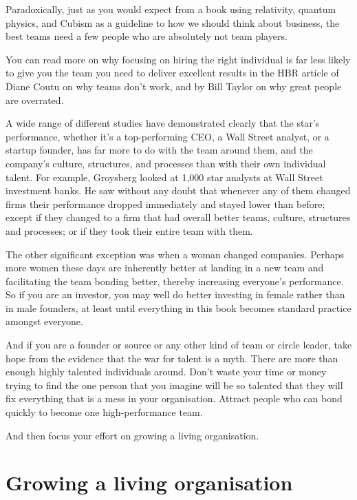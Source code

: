 Paradoxically, just as you would expect from a book using relativity,  quantum physics,  and Cubism  as a guideline to how we should think about business, the best teams need a few people who are absolutely not team players.


You can read more on why focusing on hiring the right individual is far less likely to give you the team you need to deliver excellent results in the HBR article of Diane Coutu\cite{coutu-why-teams-dont-work}  on why teams don't work, and by Bill Taylor  on why great people are overrated\cite{taylor-great-people-overrated-1, taylor-great-people-overrated-2}.


A wide range of different studies have demonstrated clearly that the star’s performance, whether it's a top-performing CEO, a Wall Street analyst, or a startup founder, has far more to do with the team around them, and the company’s culture, structures, and processes than with their own individual talent. For example, Groysberg\cite{groysberg-stars} looked at 1,000 star analysts at Wall Street investment banks. He saw without any doubt that whenever any of them changed firms their performance dropped immediately and stayed lower than before; except if they changed to a firm that had overall better teams, culture, structures and processes; or if they took their entire team with them. 


The other significant exception was when a woman changed companies. Perhaps more women these days are inherently better at landing in a new team and facilitating the team bonding better, thereby increasing everyone's performance. So if you are an investor, you may well do better investing in female rather than in male founders, at least until everything in this book becomes standard practice amongst everyone.


And if you are a founder or source or any other kind of team or circle leader, take hope from the evidence that the war for talent is a myth\cite{gladwell-talent-myth}. There are more than enough highly talented individuals around. Don't waste your time or money trying to find the one person that you imagine will be so talented that they will fix everything that is a mess in your organisation. Attract people who can bond quickly to become one high-performance team.


And then focus your effort on growing a living organisation.


\section{Growing a living organisation}
\label{section:growing-living-organisation}


